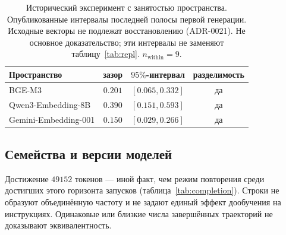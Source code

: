 \documentclass[10pt]{article}
\begin{document}
\begin{table}[t]
  \centering
  \caption{Исторический эксперимент с занятостью пространства.
    Опубликованные интервалы последней полосы первой генерации.
    Исходные векторы не подлежат восстановлению (ADR-0021). %
    Не основное доказательство; эти интервалы не заменяют
    таблицу~\ref{tab:repl}.
    $n_{\mathrm{within}}{=}9$.} %
  \label{tab:archival}
  \begin{tabular}{@{}lccc@{}}
    \toprule
    Пространство & зазор & $95\%$-интервал & разделимость \\
    \midrule
    BGE-M3 & $0.201$ & $[0.065, 0.332]$ & да \\ %
    Qwen3-Embedding-8B & $0.390$ & $[0.151, 0.593]$ & да \\ %
    Gemini-Embedding-001 & $0.150$ & $[0.029, 0.266]$ & да \\ %
    \bottomrule
  \end{tabular}
\end{table}

\subsection{Семейства и версии моделей}
\label{sec:families}

Достижение $49152$ токенов --- иной факт, чем режим повторения
среди достигших этого горизонта запусков
(таблица~\ref{tab:completion}).
Строки не образуют объединённую частоту и не задают единый эффект
дообучения на инструкциях.
Одинаковые или близкие числа завершённых траекторий
не доказывают эквивалентность.
\end{document}
